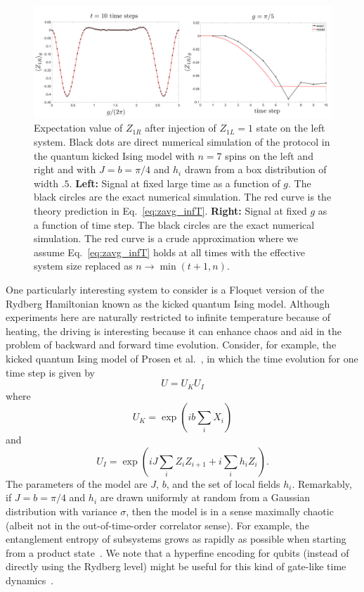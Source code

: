\documentclass[aps,pra,reprint,floatfix,superscriptaddress, nofootinbib,longbibliography,onecolumn,notitlepage,12pt, tightenlines]{revtex4-1}
\begin{document}
\begin{figure}
    \centering
    \includegraphics[width=\textwidth]{prosen_paper_fig.png}
    \caption{Expectation value of $Z_{1R}$ after injection of $Z_{1L}=1$ state on the left system. Black dots are direct numerical simulation of the protocol in the quantum kicked Ising model with $n=7$ spins on the left and right and with $J=b=\pi/4$ and $h_i$ drawn from a box distribution of width $.5$. \textbf{Left:} Signal at fixed large time as a function of $g$. The black circles are the exact numerical simulation. The red curve is the theory prediction in Eq.~\eqref{eq:zavg_infT}. \textbf{Right:} Signal at fixed $g$ as a function of time step. The black circles are the exact numerical simulation. The red curve is a crude approximation where we assume Eq.~\eqref{eq:zavg_infT} holds at all times with the effective system size replaced as $n \rightarrow \min(t+1,n)$.   }
    \label{fig:prosen_lab}
\end{figure}

One particularly interesting system to consider is a Floquet version of the Rydberg Hamiltonian known as the kicked quantum Ising model. Although experiments here are naturally restricted to infinite temperature because of heating, the driving is interesting because it can enhance chaos and aid in the problem of backward and forward time evolution. Consider, for example, the kicked quantum Ising model of Prosen et al.~\cite{Bertini_2019}, in which the time evolution for one time step is given by
\begin{equation}
    U = U_K U_I
\end{equation}
where
\begin{equation}
    U_K = \exp\left( i b \sum_i X_i \right)
\end{equation}
and
\begin{equation}
    U_I = \exp \left( i J \sum_i Z_i Z_{i+1} + i \sum_i h_i Z_i \right).
\end{equation}
The parameters of the model are $J$, $b$, and the set of local fields $h_i$. Remarkably, if $J=b=\pi/4$ and $h_i$ are drawn uniformly at random from a Gaussian distribution with variance $\sigma$, then the model is in a sense maximally chaotic (albeit not in the out-of-time-order correlator sense). For example, the entanglement entropy of subsystems grows as rapidly as possible when starting from a product state~\cite{Bertini_2019}. We note that a hyperfine encoding for qubits (instead of directly using the Rydberg level) might be useful for this kind of gate-like time dynamics~\cite{Levine_2019}.
\end{document}
